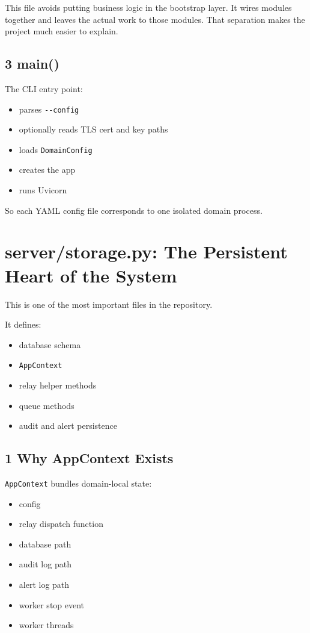 \documentclass[11pt,a4paper]{article}
\begin{document}
This file avoids putting business logic in the bootstrap layer. It wires modules together and leaves the actual work to those modules. That separation makes the project much easier to explain.

\subsection{3 main()}

The CLI entry point:

\begin{itemize}
\item parses \nolinkurl{--config}
\item optionally reads TLS cert and key paths
\item loads \nolinkurl{DomainConfig}
\item creates the app
\item runs Uvicorn
\end{itemize}

So each YAML config file corresponds to one isolated domain process.


\section{server/storage.py: The Persistent Heart of the System}

This is one of the most important files in the repository.

It defines:

\begin{itemize}
\item database schema
\item \nolinkurl{AppContext}
\item relay helper methods
\item queue methods
\item audit and alert persistence
\end{itemize}

\subsection{1 Why AppContext Exists}

\nolinkurl{AppContext} bundles domain-local state:

\begin{itemize}
\item config
\item relay dispatch function
\item database path
\item audit log path
\item alert log path
\item worker stop event
\item worker threads
\end{itemize}
\end{document}
